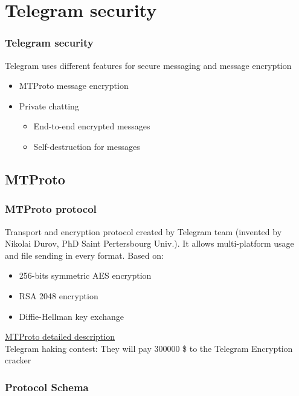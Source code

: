\documentclass{beamer}
\begin{document}
\section{Telegram security}

\begin{frame}
\frametitle{Telegram security}
Telegram uses different features for secure messaging and message encryption
\begin{itemize}
\item MTProto message encryption
\item Private chatting
\begin{itemize}
\item End-to-end encrypted messages
\item Self-destruction for messages
\end{itemize}
\end{itemize}
\end{frame}

\subsection{MTProto}

\begin{frame}
\frametitle{MTProto protocol}
Transport and encryption protocol created by Telegram team (invented by Nikolai Durov, PhD Saint Pertersbourg Univ.).
It allows multi-platform usage and file sending in every format. Based on:
\begin{itemize}
\item 256-bits symmetric AES encryption
\item RSA 2048 encryption
\item Diffie-Hellman key exchange
\end{itemize}
\href{https://core.telegram.org/mtproto/description}{\color{blue}MTProto detailed description} \\
Telegram haking contest: They will pay 300000 \$ to the Telegram Encryption cracker
\end{frame}

\subsubsection{Protocol Schema}
\end{document}
